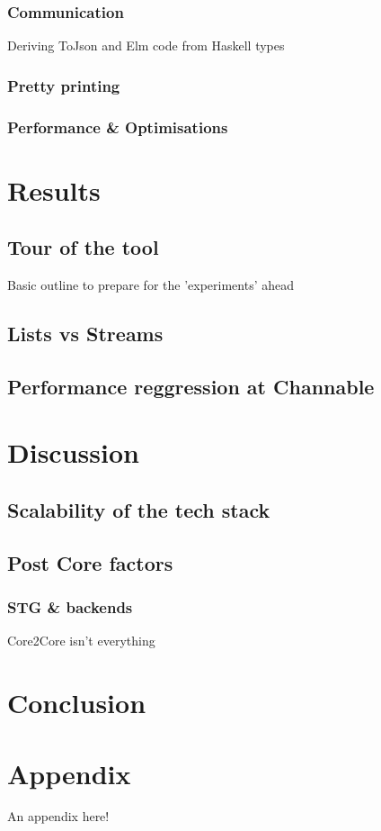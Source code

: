 \documentclass{report}
\begin{document}
\subsection{Communication}
Deriving ToJson and Elm code from Haskell types
\subsection{Pretty printing}

\subsection{Performance \& Optimisations}

\chapter{Results}
\section{Tour of the tool}
Basic outline to prepare for the 'experiments' ahead

\section{Lists vs Streams}

\section{Performance reggression at Channable}

\chapter{Discussion}
\section{Scalability of the tech stack}
\section{Post Core factors}
\subsection{STG \& backends}
Core2Core isn't everything

\chapter{Conclusion}









\appendix
\clearpage
{}
\chapter{Appendix}
An appendix here!
\end{document}

